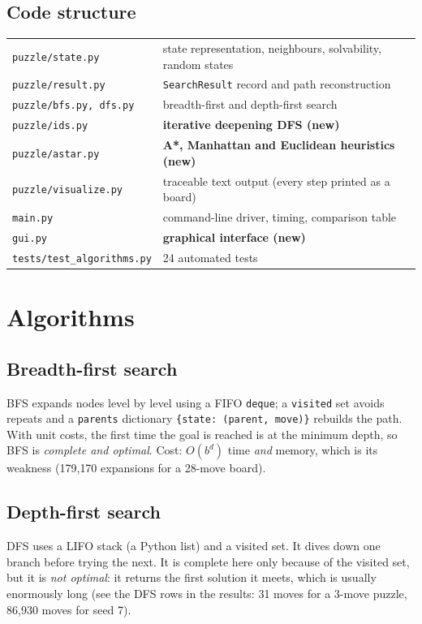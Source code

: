 \documentclass[11pt,a4paper]{article}
\begin{document}
\subsection{Code structure}
\begin{tabular}{@{}ll@{}}
\texttt{puzzle/state.py} & state representation, neighbours, solvability, random states\\
\texttt{puzzle/result.py} & \texttt{SearchResult} record and path reconstruction\\
\texttt{puzzle/bfs.py, dfs.py} & breadth-first and depth-first search\\
\texttt{puzzle/ids.py} & \textbf{iterative deepening DFS (new)}\\
\texttt{puzzle/astar.py} & \textbf{A*, Manhattan and Euclidean heuristics (new)}\\
\texttt{puzzle/visualize.py} & traceable text output (every step printed as a board)\\
\texttt{main.py} & command-line driver, timing, comparison table\\
\texttt{gui.py} & \textbf{graphical interface (new)}\\
\texttt{tests/test\_algorithms.py} & 24 automated tests
\end{tabular}

\section{Algorithms}
\subsection{Breadth-first search}
BFS expands nodes level by level using a FIFO \texttt{deque}; a \texttt{visited} set avoids repeats and a \texttt{parents} dictionary \texttt{\{state: (parent, move)\}} rebuilds the path. With unit costs, the first time the goal is reached is at the minimum depth, so BFS is \emph{complete and optimal}. Cost: $O(b^d)$ time \emph{and} memory, which is its weakness (179{,}170 expansions for a 28-move board).

\subsection{Depth-first search}
DFS uses a LIFO stack (a Python list) and a visited set. It dives down one branch before trying the next. It is complete here only because of the visited set, but it is \emph{not optimal}: it returns the first solution it meets, which is usually enormously long (see the DFS rows in the results: 31 moves for a 3-move puzzle, 86{,}930 moves for seed 7).
\end{document}
